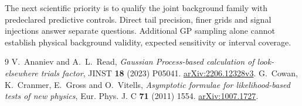 \documentclass[11pt]{article}
\begin{document}
The next scientific priority is to qualify the joint background family with predeclared predictive controls. Direct tail precision, finer grids and signal injections answer separate questions. Additional GP sampling alone cannot establish physical background validity, expected sensitivity or interval coverage.

\begin{thebibliography}{9}
 V.~Ananiev and A.~L.~Read, \emph{Gaussian Process-based calculation of look-elsewhere trials factor}, JINST \textbf{18} (2023) P05041. \href{https://arxiv.org/abs/2206.12328v3}{arXiv:2206.12328v3}.
 G.~Cowan, K.~Cranmer, E.~Gross and O.~Vitells, \emph{Asymptotic formulae for likelihood-based tests of new physics}, Eur. Phys. J. C \textbf{71} (2011) 1554. \href{https://arxiv.org/abs/1007.1727}{arXiv:1007.1727}.
\end{thebibliography}
\end{document}
